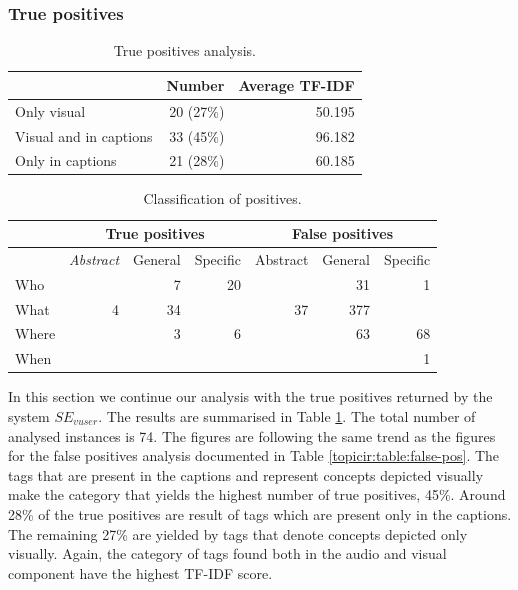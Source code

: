 \subsubsection{True positives}

\begin{table}[tb]
\centering
\begin{footnotesize}
\begin{tabular}{l|r|r}
\toprule
 & Number & Average TF-IDF\\
 \hline
Only visual & 20 (27\%)& 50.195\\
\hline
Visual and in captions& 33 (45\%)& 96.182\\
\hline
Only in captions  & 21 (28\%)& 60.185\\
\bottomrule
\end{tabular}
\caption{True positives analysis.}
\label{topicir:table:true-pos}
\end{footnotesize}
\end{table}

\begin{table}
\centering
\begin{footnotesize}
\begin{tabular}{l|r|r|r|r|r|r}
\toprule
 & \multicolumn{3}{|c|}{\textbf{True positives}} & \multicolumn{3}{c}{\textbf{False positives}}\\
 \hline
  & \textit{Abstract} & General & Specific & Abstract & General & Specific\\
\hline
Who & & 7& 20& &31 &1\\
\hline
What &4 &34 & &37 & 377&\\
\hline
Where & & 3&6 & &63 &68\\
\hline
When & & & & & &1\\
\bottomrule
\end{tabular}
\caption{Classification of positives.}
\label{topicir:table:pan-shat}
\end{footnotesize}
\end{table}

In this section we continue our analysis with the true positives returned by the system $SE_{vuser}$. The results are summarised in Table \ref{topicir:table:true-pos}. The total number of analysed instances is 74. The figures are following the same trend as the figures for the false positives analysis documented in Table \ref{topicir:table:false-pos}. The tags that are present in the captions and represent concepts depicted visually make the category that yields the highest number of true positives, 45\%. Around 28\% of the true positives are result of tags which are present only in the captions. The remaining 27\% are yielded by tags that denote concepts depicted only visually. Again, the category of tags found both in the audio and visual component have the highest TF-IDF score.


